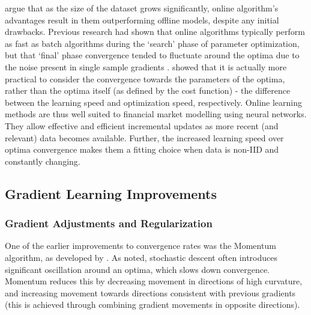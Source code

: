 \documentclass[a4paper,11pt,oneside]{article}
\theoremstyle{plain}
\theoremstyle{definition}
\begin{document}
	\citet{Bottou} argue that as the size of the dataset grows significantly, online algorithm's advantages result in 
	them outperforming offline models, despite any initial drawbacks. Previous research had shown that online 
	algorithms typically perform as fast as batch algorithms during the `search' phase of parameter optimization, but 
	that `final' phase convergence tended to fluctuate around the optima due to the noise present in single sample 
	gradients \citep{LeCun, Bottou2}. \citet{Bottou} showed that it is actually more practical to consider the convergence towards
	the parameters of the optima, rather than the optima itself (as defined by the cost function) - the difference 
	between the learning speed and optimization speed, respectively. Online learning methods are thus well suited to financial market modelling using neural networks. They allow effective and efficient incremental updates as more recent (and relevant) data 
	becomes available. Further, the increased learning speed over optima convergence makes them a fitting choice when data is non-IID and 
	constantly changing.

	
	
	
	\subsection{Gradient Learning Improvements}\label{lr_grad_improv}
	
	\subsubsection{Gradient Adjustments and Regularization}
	
	One of the earlier improvements to convergence rates was the Momentum algorithm, as developed by \citet{Tseng}. 
	As noted, stochastic descent often introduces significant oscillation around an optima, which slows down 
	convergence. Momentum reduces this by decreasing movement in directions of high curvature, and  
	increasing movement towards directions consistent with previous gradients (this is achieved through combining 
	gradient movements in opposite directions).
	\hfill\break
	
\end{document}
